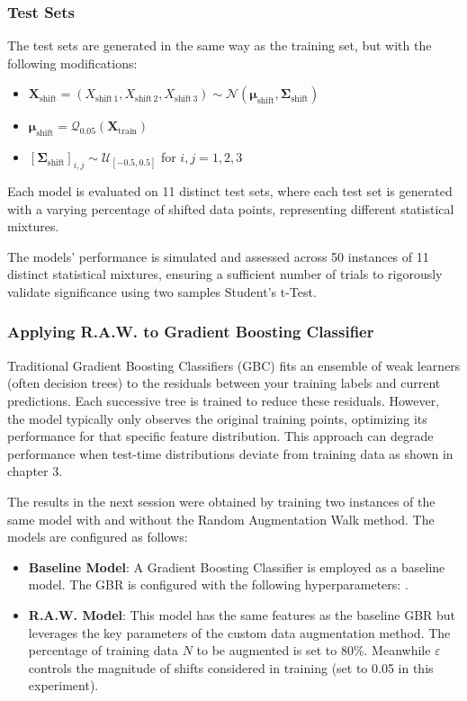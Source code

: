 \subsubsection{Test Sets}
The test sets are generated in the same way as the training set, but with the following modifications:

\begin{itemize}
    \item $ \boldsymbol{X}_{\text{shift}} = (X_{\text{shift}\,1}, X_{\text{shift}\,2}, X_{\text{shift}\,3}) \sim \mathcal{N}(\boldsymbol{\mu}_{\text{shift}}, \boldsymbol{\Sigma}_{\text{shift}}) $
    \item $ \boldsymbol{\mu}_{\text{shift}} = \mathcal{Q}_{0.05}(\boldsymbol{X}_{\text{train}})$
    \item $ [\boldsymbol{\Sigma}_{\text{shift}}]_{i,j} \sim \mathcal{U}_{[-0.5,0.5]} $ for $ i, j = 1, 2, 3 $
\end{itemize}
Each model is evaluated on 11 distinct test sets, where each test set is generated with a varying percentage of shifted data points, representing different statistical mixtures.

The models' performance is simulated and assessed across 50 instances of 11 distinct statistical mixtures, ensuring a sufficient number of trials to rigorously validate significance using two samples Student's t-Test.

\subsubsection{Applying R.A.W. to Gradient Boosting Classifier}

Traditional Gradient Boosting Classifiers (GBC) fits an ensemble of weak learners (often decision trees) to the residuals between your training labels and current predictions. Each successive tree is trained to reduce these residuals. However, the model typically only observes the original training points, optimizing its performance for that specific feature distribution. This approach can degrade performance when test-time distributions deviate from training data as shown in chapter 3. 

The results in the next session were obtained by training two instances of the same model with and without the Random Augmentation Walk method. The models are configured as follows:
\begin{itemize}
    \item \textbf{Baseline Model}: A Gradient Boosting Classifier is employed as a baseline model. The GBR is configured with the following hyperparameters: .
    \item \textbf{R.A.W. Model}: This model has the same features as the baseline GBR but leverages the key parameters of the custom data augmentation method. The percentage of training data $N$ to be augmented is set to 80\%. Meanwhile $\varepsilon$ controls the magnitude of shifts considered in training (set to 0.05 in this experiment).
\end{itemize}






